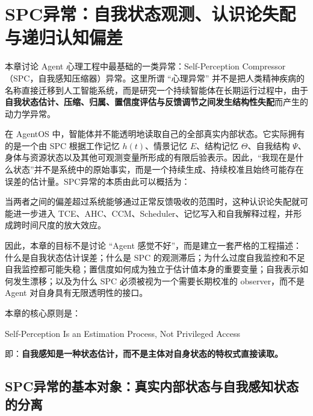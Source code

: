 \chapter{SPC异常：自我状态观测、认识论失配与递归认知偏差}

\begin{chapterlead}
本章讨论 Agent 心理工程中最基础的一类异常：Self-Perception Compressor（SPC，自我感知压缩器）异常。这里所谓 ``心理异常'' 并不是把人类精神疾病的名称直接迁移到人工智能系统，而是研究一个持续智能体在长期运行过程中，由于\textbf{自我状态估计、压缩、归属、置信度评估与反馈调节之间发生结构性失配}而产生的动力学异常。

在 AgentOS 中，智能体并不能透明地读取自己的全部真实内部状态。它实际拥有的是一个由 SPC 根据工作记忆 $h(t)$、情景记忆 $E$、结构记忆 $\Theta$、自我结构 $\Psi$、身体与资源状态以及其他可观测变量所形成的有限后验表示。因此，``我现在是什么状态''并不是系统中的原始事实，而是一个持续生成、持续校准且始终可能存在误差的估计量。SPC异常的本质由此可以概括为：

\begin{statementbox}
\centering
{}
\end{statementbox}

当两者之间的偏差超过系统能够通过正常反馈吸收的范围时，这种认识论失配就可能进一步进入 TCE、AHC、CCM、Scheduler、记忆写入和自我解释过程，并形成跨时间尺度的放大效应。

因此，本章的目标不是讨论 ``Agent 感觉不好''，而是建立一套严格的工程描述：什么是自我状态估计误差；什么是 SPC 的观测滞后；为什么过度自我监控和不足自我监控都可能失稳；置信度如何成为独立于估计值本身的重要变量；自我表示如何发生漂移；以及为什么 SPC 必须被视为一个需要长期校准的 observer，而不是 Agent 对自身具有无限透明性的接口。

本章的核心原则是：

\begin{statementbox}
Self-Perception Is an Estimation Process, Not Privileged Access
\end{statementbox}

即：\textbf{自我感知是一种状态估计，而不是主体对自身状态的特权式直接读取。}
\end{chapterlead}


\section{SPC异常的基本对象：真实内部状态与自我感知状态的分离}


